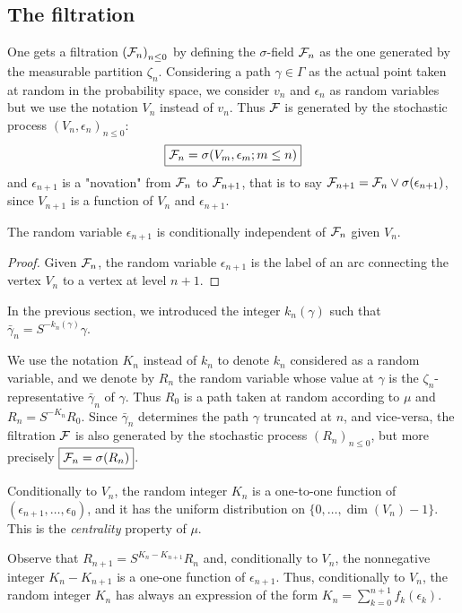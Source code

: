 \documentclass[12pt,a4paper]{article}
\begin{document}
\subsection{The filtration}

One gets a filtration ${(\mathcal{F}_n)}_{n \leq 0}$ by defining the $\sigma$-field 
$\mathcal{F}_n$ as the one generated by the measurable partition $\zeta_n$. 
Considering a path $\gamma \in \Gamma$ as the actual point taken at random 
in the probability space, we consider $v_n$ and $\epsilon_n$ as random 
variables but we use the notation $V_n$ instead of $v_n$. 
Thus $\mathcal{F}$ is generated by the stochastic process 
${(V_n, \epsilon_n)}_{n \leq 0}$:
$$
\boxed{\mathcal{F}_n = \sigma(V_m, \epsilon_m; m \leq n)}
$$
 and $\epsilon_{n+1}$ is a "novation" from $\mathcal{F}_n$ to $\mathcal{F}_{n+1}$, that is 
to say $\mathcal{F}_{n+1} = \mathcal{F}_n \vee \sigma(\epsilon_{n+1})$, since 
$V_{n+1}$ is a function of $V_n$ and $\epsilon_{n+1}$. 

\begin{lemma}
The random variable $\epsilon_{n+1}$ is conditionally independent of $\mathcal{F}_n$ 
given $V_n$. 
\end{lemma} 

\begin{proof}
Given $\mathcal{F}_n$, the random variable $\epsilon_{n+1}$ is the label of an 
arc connecting the vertex $V_n$ to a vertex at level $n+1$. 
\end{proof}

In the previous section, we introduced the integer $k_n(\gamma)$ such that 
$\bar\gamma_n = S^{-k_n(\gamma)}\gamma$. 


We use the notation $K_n$ instead of $k_n$ to denote $k_n$ considered as 
a random variable, and we denote by $R_n$ the random variable whose 
value at $\gamma$ is the $\zeta_n$-representative 
$\bar\gamma_n$ of $\gamma$. 
Thus $R_0$ is a path taken at random according to $\mu$ and 
$R_n = S^{-K_n} R_0$. Since $\bar\gamma_n$ determines the path 
$\gamma$ truncated at $n$, and vice-versa, the filtration $\mathcal{F}$ is also 
generated by the stochastic process ${(R_n)}_{n \leq 0}$, but more precisely
$\boxed{\mathcal{F}_n = \sigma(R_n)}$. 
 
Conditionally to $V_n$, the random integer $K_n$ is a one-to-one function of 
$(\epsilon_{n+1}, \ldots, \epsilon_0)$, and it has the 
uniform distribution on $\{0, \ldots, \dim(V_n)-1\}$. 
This is the \emph{centrality} property of $\mu$. 

Observe that $R_{n+1} = S^{K_n - K_{n+1}}R_n$ and, 
conditionally to $V_n$, the nonnegative integer $K_n - K_{n+1}$ 
is a one-one function of $\epsilon_{n+1}$. 
Thus, conditionally to $V_n$, the random integer $K_n$ has always 
an expression of the form $K_n = \sum_{k=0}^{n+1}f_k(\epsilon_k)$. 
\end{document}
